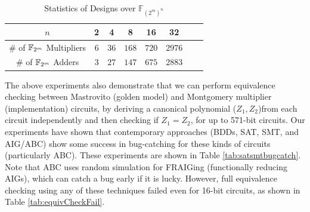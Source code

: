 \begin{table}[!hbt]
\begin{center}
{\small
\caption{Statistics of Designs over $\mathbb{F}_{(2^m)^n}$}
\label{tbl:stats}
\begin{tabular}{|c|c|c|c|c|c|c|c|} 
\hline
$n$ & 2 & 4 & 8 & 16 & 32 \\
\hline
\# of ${\mathbb{F}}_{2^m}$ Multipliers  & $6$ & $36$ & $168$ & $720$ & $2976$ \\
\hline
\# of ${\mathbb{F}}_{2^m}$ Adders       & $3$ & $27$ & $147$ & $675$ & $2883$  \\
\hline
\end{tabular}
}
\end{center}
\end{table}




The above experiments also demonstrate that we can perform equivalence
checking between Mastrovito (golden model) and Montgomery multiplier
(implementation) circuits, by deriving a canonical polynomial ($Z_1,
Z_2$)from each circuit independently and then checking if $Z_1 =
Z_2$, for up to 571-bit circuits. Our experiments have shown that contemporary 
approaches (BDDs, SAT, SMT, and AIG/ABC) show some success in bug-catching for these
kinds of circuits (particularly ABC). These experiments are shown in Table \ref{tab:satsmtbugcatch}.
Note that ABC uses random simulation for FRAIGing (functionally reducing AIGs), which
can catch a bug early if it is lucky.
However, full equivalence checking using any of these techniques failed even for 
16-bit circuits, as shown in Table \ref{tab:equivCheckFail}.

